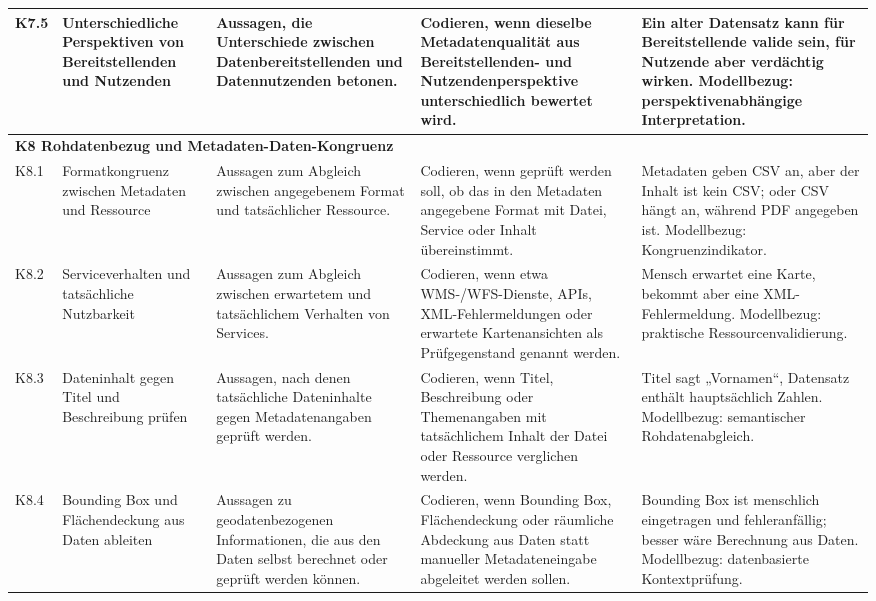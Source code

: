 \begin{longtable}{p{1cm} p{2.5cm} p{3.2cm} p{4.5cm} p{4.5cm}}
K7.5 & Unterschiedliche Perspektiven von Bereitstellenden und Nutzenden
& Aussagen, die Unterschiede zwischen Datenbereitstellenden und Datennutzenden betonen.
& Codieren, wenn dieselbe Metadatenqualität aus Bereitstellenden- und Nutzendenperspektive unterschiedlich bewertet wird.
& Ein alter Datensatz kann für Bereitstellende valide sein, für Nutzende aber verdächtig wirken. Modellbezug: perspektivenabhängige Interpretation. \\

\midrule
\multicolumn{5}{l}{\textbf{K8 Rohdatenbezug und Metadaten-Daten-Kongruenz}} \\
\midrule

K8.1 & Formatkongruenz zwischen Metadaten und Ressource
& Aussagen zum Abgleich zwischen angegebenem Format und tatsächlicher Ressource.
& Codieren, wenn geprüft werden soll, ob das in den Metadaten angegebene Format mit Datei, Service oder Inhalt übereinstimmt.
& Metadaten geben CSV an, aber der Inhalt ist kein CSV; oder CSV hängt an, während PDF angegeben ist. Modellbezug: Kongruenzindikator. \\

K8.2 & Serviceverhalten und tatsächliche Nutzbarkeit
& Aussagen zum Abgleich zwischen erwartetem und tatsächlichem Verhalten von Services.
& Codieren, wenn etwa WMS-/WFS-Dienste, APIs, XML-Fehlermeldungen oder erwartete Kartenansichten als Prüfgegenstand genannt werden.
& Mensch erwartet eine Karte, bekommt aber eine XML-Fehlermeldung. Modellbezug: praktische Ressourcenvalidierung. \\

K8.3 & Dateninhalt gegen Titel und Beschreibung prüfen
& Aussagen, nach denen tatsächliche Dateninhalte gegen Metadatenangaben geprüft werden.
& Codieren, wenn Titel, Beschreibung oder Themenangaben mit tatsächlichem Inhalt der Datei oder Ressource verglichen werden.
& Titel sagt „Vornamen“, Datensatz enthält hauptsächlich Zahlen. Modellbezug: semantischer Rohdatenabgleich. \\

K8.4 & Bounding Box und Flächendeckung aus Daten ableiten
& Aussagen zu geodatenbezogenen Informationen, die aus den Daten selbst berechnet oder geprüft werden können.
& Codieren, wenn Bounding Box, Flächendeckung oder räumliche Abdeckung aus Daten statt manueller Metadateneingabe abgeleitet werden sollen.
& Bounding Box ist menschlich eingetragen und fehleranfällig; besser wäre Berechnung aus Daten. Modellbezug: datenbasierte Kontextprüfung. \\


\end{longtable}
